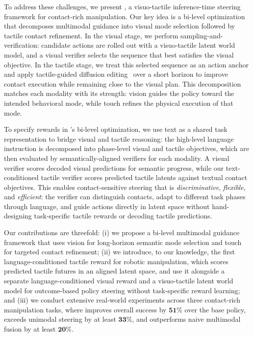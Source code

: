 To address these challenges, we present
\ours, a visuo-tactile inference-time steering framework for contact-rich manipulation.
Our key idea is a bi-level 
optimization that decomposes multimodal guidance into visual mode selection followed by tactile contact refinement. 
In the visual stage, we perform sampling-and-verification: candidate actions are rolled out with a visuo-tactile latent world model, and a visual verifier selects the sequence that best satisfies the visual objective. In the tactile stage, we treat this selected sequence as an action anchor and apply tactile-guided diffusion editing~\cite{meng2021sdedit} over a short horizon to improve contact execution while remaining close to the visual plan. This decomposition matches each modality with its strength: vision guides the policy toward the intended behavioral mode, while touch refines the physical execution of that mode.

To specify rewards in \ours's bi-level optimization, we use text as a shared task representation to bridge visual and tactile reasoning: the high-level language instruction is decomposed into phase-level visual and tactile objectives, which are then evaluated by semantically-aligned verifiers for each modality.
A visual verifier scores decoded visual predictions for semantic progress, while our text-conditioned tactile verifier scores predicted tactile latents against textual contact objectives. This enables contact-sensitive steering that is \textit{discriminative}, \textit{flexible}, and \textit{efficient}: the verifier can distinguish contacts, adapt to different task phases through language, and guide actions directly in latent space without hand-designing task-specific tactile rewards or decoding tactile predictions.

 Our contributions are threefold: (i) we propose a bi-level multimodal guidance framework that uses vision for long-horizon semantic mode selection and touch for targeted contact refinement; (ii) we introduce, to our knowledge, the first language-conditioned tactile reward for robotic manipulation, which scores predicted tactile futures in an aligned latent space, and use it alongside a separate language-conditioned visual reward and a visuo-tactile latent world model for outcome-based policy steering without task-specific reward learning; and (iii) we conduct extensive real-world experiments across three contact-rich manipulation tasks, where \ours improves overall success by $\mathbf{51\%}$ over the base policy, exceeds unimodal steering by at least $\mathbf{33\%}$, and outperforms naive multimodal fusion by at least $\mathbf{20\%}$.


